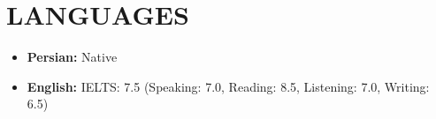 \documentclass[11pt,a4paper,sans]{moderncv}        %
\begin{document}
\vspace{2pt}

\section{LANGUAGES}

\vspace{1pt}

\begin{itemize}

\item \textbf{Persian:} Native

\vspace{1pt}

\item \textbf{English:} IELTS: 7.5 (Speaking: 7.0, Reading: 8.5, Listening: 7.0, Writing: 6.5)

\vspace{1pt}

\end{itemize}












\nocite{*}



\end{document}
